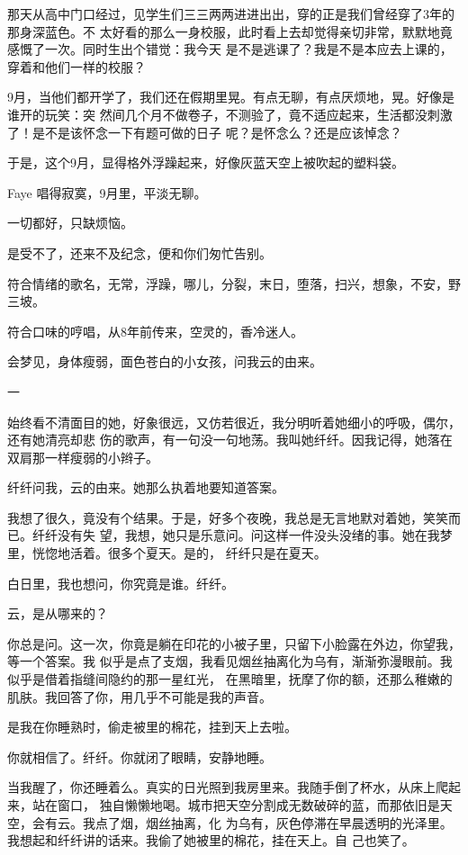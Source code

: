\documentclass[12pt,a4paper]{article}
\newcommand{\subpart}[1]{
	\begingroup \par
	\vspace{1ex} \centering #1
	\par \endgroup
}
\begin{document}
		那天从高中门口经过，见学生们三三两两进进出出，穿的正是我们曾经穿了3年的那身深蓝色。不
	太好看的那么一身校服，此时看上去却觉得亲切非常，默默地竟感慨了一次。同时生出个错觉：我今天
	是不是逃课了？我是不是本应去上课的，穿着和他们一样的校服？

		9月，当他们都开学了，我们还在假期里晃。有点无聊，有点厌烦地，晃。好像是谁开的玩笑：突
	然间几个月不做卷子，不测验了，竟不适应起来，生活都没刺激了！是不是该怀念一下有题可做的日子
	呢？是怀念么？还是应该悼念？

		于是，这个9月，显得格外浮躁起来，好像灰蓝天空上被吹起的塑料袋。

		Faye 唱得寂寞，9月里，平淡无聊。

		一切都好，只缺烦恼。

		是受不了，还来不及纪念，便和你们匆忙告别。

		符合情绪的歌名，无常，浮躁，哪儿，分裂，末日，堕落，扫兴，想象，不安，野三坡。

		符合口味的哼唱，从8年前传来，空灵的，香冷迷人。

	\endwriting



		会梦见，身体瘦弱，面色苍白的小女孩，问我云的由来。

		\subpart{一}

		始终看不清面目的她，好象很远，又仿若很近，我分明听着她细小的呼吸，偶尔，还有她清亮却悲
	伤的歌声，有一句没一句地荡。我叫她纤纤。因我记得，她落在双肩那一样瘦弱的小辫子。

		纤纤问我，云的由来。她那么执着地要知道答案。

		我想了很久，竟没有个结果。于是，好多个夜晚，我总是无言地默对着她，笑笑而已。纤纤没有失
	望，我想，她只是乐意问。问这样一件没头没绪的事。她在我梦里，恍惚地活着。很多个夏天。是的，
	纤纤只是在夏天。

		白日里，我也想问，你究竟是谁。纤纤。

		云，是从哪来的？

		你总是问。这一次，你竟是躺在印花的小被子里，只留下小脸露在外边，你望我，等一个答案。我
	似乎是点了支烟，我看见烟丝抽离化为乌有，渐渐弥漫眼前。我似乎是借着指缝间隐约的那一星红光，
	在黑暗里，抚摩了你的额，还那么稚嫩的肌肤。我回答了你，用几乎不可能是我的声音。

		是我在你睡熟时，偷走被里的棉花，挂到天上去啦。

		你就相信了。纤纤。你就闭了眼睛，安静地睡。

		当我醒了，你还睡着么。真实的日光照到我房里来。我随手倒了杯水，从床上爬起来，站在窗口，
	独自懒懒地喝。城市把天空分割成无数破碎的蓝，而那依旧是天空，会有云。我点了烟，烟丝抽离，化
	为乌有，灰色停滞在早晨透明的光泽里。我想起和纤纤讲的话来。我偷了她被里的棉花，挂在天上。自
	己也笑了。
\end{document}
